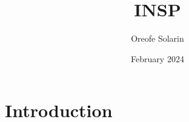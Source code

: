 \documentclass{article}
\title{INSP}
\author{Oreofe Solarin}
\date{February 2024}
\begin{document}
\maketitle

\section{Introduction}
\end{document}
